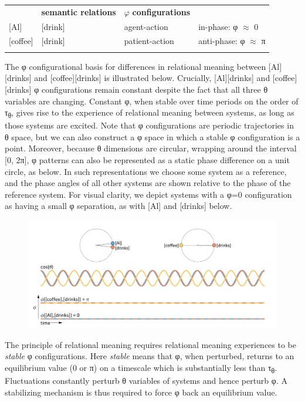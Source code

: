 \begin{tabularx}{\textwidth}{XXXX}
\lsptoprule
\multicolumn{2}{c}{\textbf{conceptual systems}} & \textbf{semantic relations} & \textbf{$\varphi$} \textbf{configurations}\\{}
[Al] & [drink] & agent-action & in-phase: φ ${\approx}$ 0\\{}
[coffee] & [drink] & patient-action & anti-phase: φ ${\approx}$ π\\
\lspbottomrule
\end{tabularx}

  The φ configurational basis for differences in relational meaning between [Al][drinks] and [coffee][drinks] is illustrated below. Crucially, [Al][drinks] and [coffee][drinks] φ configurations remain constant despite the fact that all three θ variables are changing. Constant φ, when stable over time periods on the order of τ\textsubscript{θ}, gives rise to the experience of relational meaning between systems, as long as those systems are excited. Note that φ configurations are periodic trajectories in θ space, but we can also construct a φ space in which a stable φ configuration is a point. Moreover, because θ dimensions are circular, wrapping around the interval [0, 2π], φ patterns can also be represented as a static phase difference on a unit circle, as below. In such representations we choose some system as a reference, and the phase angles of all other systems are shown relative to the phase of the reference system. For visual clarity, we depict systems with a φ=0 configuration as having a small φ separation, as with [Al] and [drinks] below.

  
\begin{figure}
\includegraphics[width=\textwidth]{figures/Tilsen-img15.png}
\caption{\missingcaption}
\label{fig:}
\end{figure}
 

  The principle of relational meaning requires relational meaning experiences to be \textit{stable} φ configurations. Here \textit{stable} means that φ, when perturbed, returns to an equilibrium value (0 or π) on a timescale which is substantially less than τ\textsubscript{θ}. Fluctuations constantly perturb θ variables of systems and hence perturb φ. A stabilizing mechanism is thus required to force φ back an equilibrium value. 

